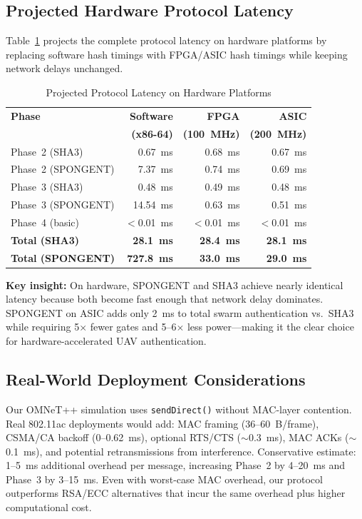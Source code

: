 \documentclass[11pt,a4paper]{article}
\begin{document}
\subsection{Projected Hardware Protocol Latency}

Table~\ref{tab:hw_latency} projects the complete protocol latency on hardware platforms by replacing software hash timings with FPGA/ASIC hash timings while keeping network delays unchanged.

\begin{table}[H]
\centering
\caption{Projected Protocol Latency on Hardware Platforms}
\label{tab:hw_latency}
\begin{tabular}{@{}lrrr@{}}
\toprule
\textbf{Phase} & \textbf{Software} & \textbf{FPGA} & \textbf{ASIC} \\
& \textbf{(x86-64)} & \textbf{(100~MHz)} & \textbf{(200~MHz)} \\
\midrule
Phase~2 (SHA3) & 0.67~ms & 0.68~ms & 0.67~ms \\
Phase~2 (SPONGENT) & 7.37~ms & 0.74~ms & 0.69~ms \\
Phase~3 (SHA3) & 0.48~ms & 0.49~ms & 0.48~ms \\
Phase~3 (SPONGENT) & 14.54~ms & 0.63~ms & 0.51~ms \\
Phase~4 (basic) & $<$0.01~ms & $<$0.01~ms & $<$0.01~ms \\
\midrule
\textbf{Total (SHA3)} & \textbf{28.1~ms} & \textbf{28.4~ms} & \textbf{28.1~ms} \\
\textbf{Total (SPONGENT)} & \textbf{727.8~ms} & \textbf{33.0~ms} & \textbf{29.0~ms} \\
\bottomrule
\end{tabular}
\end{table}

\textbf{Key insight:} On hardware, SPONGENT and SHA3 achieve nearly identical latency because both become fast enough that network delay dominates. SPONGENT on ASIC adds only 2~ms to total swarm authentication vs.\ SHA3 while requiring 5$\times$ fewer gates and 5--6$\times$ less power---making it the clear choice for hardware-accelerated UAV authentication.

\subsection{Real-World Deployment Considerations}

Our OMNeT++ simulation uses \texttt{sendDirect()} without MAC-layer contention. Real 802.11ac deployments would add: MAC framing (36--60~B/frame), CSMA/CA backoff (0--0.62~ms), optional RTS/CTS ($\sim$0.3~ms), MAC ACKs ($\sim$0.1~ms), and potential retransmissions from interference. Conservative estimate: 1--5~ms additional overhead per message, increasing Phase~2 by 4--20~ms and Phase~3 by 3--15~ms. Even with worst-case MAC overhead, our protocol outperforms RSA/ECC alternatives that incur the same overhead plus higher computational cost.
\end{document}

